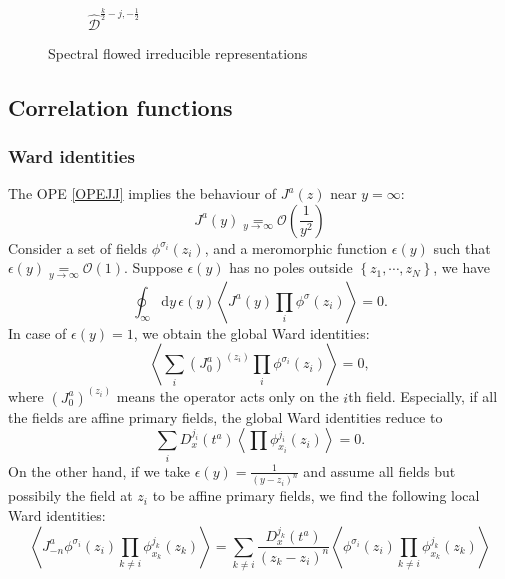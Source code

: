 \documentclass[10pt,a4paper]{article}
\numberwithin{equation}{section}
\newcommand{\vev}[1]{\left\langle #1 \right\rangle}
\begin{document}
\begin{figure}[htbp]
\begin{subfigure}[b]{0.48\textwidth}
        \caption{$\widehat{\mathcal{D}}^{\frac{k}{2}-j, -\frac{1}{2}}$}
        \label{fig:D 1/2-1}
    \end{subfigure}

    \caption{Spectral flowed irreducible representations}
    \label{fig:irrepSF}
\end{figure}

\subsection{Correlation functions}

\subsubsection*{Ward identities}
The OPE \eqref{OPEJJ} implies the behaviour of $J^{a}(z)$ near $y = \infty$:
\begin{equation}
    \boxed{
        J^{a}(y) \underset{y \rightarrow \infty}{=} \mathcal{O}\left(\frac{1}{y^{2}}\right)
    }
\end{equation}
Consider a set of fields $\phi^{\sigma_{i}}(z_{i})$, and a meromorphic function $\epsilon(y)$ such that
$\epsilon(y) \underset{y \rightarrow \infty}{=} \mathcal{O}\left(1\right) $. Suppose $\epsilon(y)$
has no poles outside $\left\{z_{1},\cdots,z_{N} \right\}$, we have 
\begin{equation}
    \oint_{\infty} \mathrm{d} y \, \epsilon(y) \vev{J^{a}(y) \prod_{i} \phi^{\sigma}(z_{i})} = 0. \label{WardId}
\end{equation}
In case of $\epsilon(y) = 1$, we obtain the global Ward identities:
\begin{equation}
    \vev{\sum_{i} \left(J^{a}_{0}\right)^{(z_{i})} \prod_{i} \phi^{\sigma_{i}}(z_{i})} = 0,
\end{equation}
where $\left(J^{a}_{0}\right)^{(z_{i})}$ means the operator acts only on the $i$th field. Especially, if all the fields are affine primary 
fields, the global Ward identities reduce to 
\begin{equation}
    \sum_{i} D^{j_{i}}_{x}(t^{a}) \vev{\prod \phi^{j_{i}}_{x_{i}}(z_{i})} = 0. \label{GlobalWard}
\end{equation}
On the other hand, if we take $\epsilon(y) = \frac{1}{(y-z_{i})^{n}}$ and assume all fields but possibily the field at 
$z_{i}$ to be affine primary fields, we find the following local Ward identities:
\begin{equation}
    \vev{J^{a}_{-n} \phi^{\sigma_{i}}(z_{i}) \prod_{k \neq i} \phi^{j_{k}}_{x_{k}}(z_{k})} = \sum_{k\neq i} \frac{D^{j_{k}}_{x}(t^{a})}{(z_{k}-z_{i})^{n}} \vev{ \phi^{\sigma_{i}}(z_{i}) \prod_{k \neq i} \phi^{j_{k}}_{x_{k}}(z_{k})} \label{LocalWard}
\end{equation}
\end{document}
